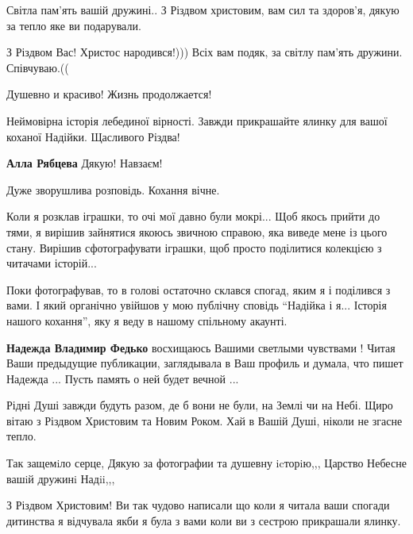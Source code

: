 \begin{itemize}

Світла пам'ять вашій дружині.. З Різдвом христовим, вам сил та здоров'я, дякую за тепло яке ви подарували.


З Різдвом Вас! Христос народився!))) Всіх вам подяк, за світлу пам'ять дружини.
Співчуваю.((

Душевно и красиво!
Жизнь продолжается!


Неймовірна історія лебединої вірності. Завжди прикрашайте ялинку для вашої
коханої Надійки. Щасливого Різдва!

\textbf{Алла Рябцева} Дякую! Навзаєм!


Дуже зворушлива розповідь. Кохання вічне.


Коли я розклав іграшки, то очі мої давно були мокрі... Щоб якось прийти до
тями, я вирішив зайнятися якоюсь звичною справою, яка виведе мене із цього
стану. Вирішив сфотографувати іграшки, щоб просто поділитися колекцією з
читачами історій...

Поки фотографував, то в голові остаточно склався спогад, яким я і поділився з
вами. І який органічно увійшов у мою публічну сповідь \enquote{Надійка і я... Історія
нашого кохання}, яку я веду в нашому спільному акаунті.

\begin{itemize} %
\textbf{Надежда Владимир Федько} восхищаюсь Вашими светлыми чувствами ! Читая Ваши предыдущие публикации, заглядывала в Ваш профиль и думала, что пишет Надежда ...
Пусть память о ней будет вечной ...
\end{itemize} %


Рідні Душі завжди будуть разом, де б вони не були, на Землі чи на Небі. Щиро
вітаю з Різдвом Христовим та Новим Роком. Хай в Вашій Душі, ніколи не згасне
тепло.


Так защемiло серце, Дякую за фотографии та душевну icторiю,,, Царство Небесне вашiй дружинi Надii,,,


З Різдвом Христовим! Ви так чудово написали що коли я читала ваши спогади
дитинства я відчувала якби я була з вами коли ви з сестрою прикрашали ялинку.


\end{itemize}
